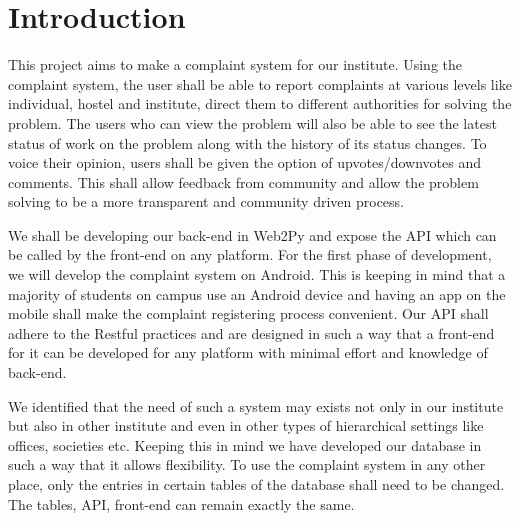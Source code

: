 \documentclass[12pt]{article}
\begin{document}
\section{Introduction}
This project aims to make a complaint system for our institute. Using the complaint system, the user shall be able to report complaints at various levels like individual, hostel and institute, direct them to different authorities for solving the problem. The users who can view the problem will also be able to see the latest status of work on the problem along with the history of its status changes. To voice their opinion, users shall be given the option of upvotes/downvotes and comments. This shall allow feedback from community and allow the problem solving to be a more transparent and community driven process.
\par
We shall be developing our back-end in Web2Py and expose the API which can be called by the front-end on any platform. For the first phase of development, we will develop the complaint system on Android. This is keeping in mind that a majority of students on campus use an Android device and having an app on the mobile shall make the complaint registering process convenient. Our API shall adhere to the Restful practices and are designed in such a way that a front-end for it can be developed for any platform with minimal effort and knowledge of back-end. 
\par
We identified that the need of such a system may exists not only in our institute but also in other institute and even in other types of hierarchical settings like offices, societies etc. Keeping this in mind we have developed our database in such a way that it allows flexibility. To use the complaint system in any other place, only the entries in certain tables of the database shall need to be changed. The tables, API, front-end can remain exactly the same.
\end{document}
